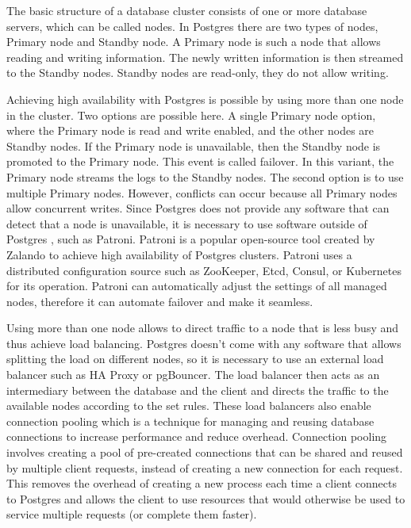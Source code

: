 The basic structure of a database cluster consists of one or more database servers, which can be called nodes. In Postgres there are two types of nodes, Primary node and Standby node.  A Primary node is such a node that allows reading and writing information. The newly written information is then streamed to the Standby nodes. Standby nodes are read-only, they do not allow writing. \cite{pg14replication}

Achieving high availability with Postgres is possible by using more than one node in the cluster. Two options are possible here. A single Primary node option, where the Primary node is read and write enabled, and the other nodes are Standby nodes. If the Primary node is unavailable, then the Standby node is promoted to the Primary node. This event is called failover. In this variant, the Primary node streams the logs to the Standby nodes. The second option is to use multiple Primary nodes. However, conflicts can occur because all Primary nodes allow concurrent writes. \cite{docuPgHA}
Since Postgres does not provide any software that can detect that a node is unavailable, it is necessary to use software outside of Postgres \cite{docuPgFailover}, such as Patroni.
Patroni is a popular open-source tool created by Zalando to achieve high availability of Postgres clusters. Patroni uses a distributed configuration source such as ZooKeeper, Etcd, Consul, or Kubernetes for its operation. Patroni can automatically adjust the settings of all managed nodes, therefore it can automate failover and make it seamless. \cite{PalarkMigratingPg} \cite{PatroniDocu}


Using more than one node allows to direct traffic to a node that is less busy and thus achieve load balancing. Postgres doesn't come with any software that allows splitting the load on different nodes, so it is necessary to use an external load balancer such as HA Proxy or pgBouncer. The load balancer then acts as an intermediary between the database and the client and directs the traffic to the available nodes according to the set rules. These load balancers also enable connection pooling which is a technique for managing and reusing database connections to increase performance and reduce overhead. Connection pooling involves creating a pool of pre-created connections that can be shared and reused by multiple client requests, instead of creating a new connection for each request. This removes the overhead of creating a new process each time a client connects to Postgres and allows the client to use resources that would otherwise be used to service multiple requests (or complete them faster). \cite{PerconaBlogConnectionPooling}

